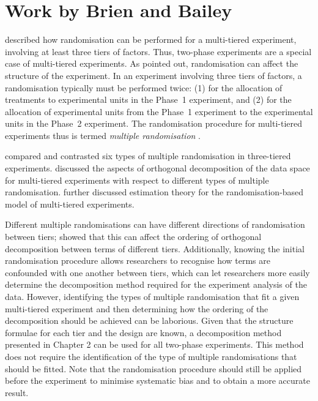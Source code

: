 \section{Work by Brien and Bailey} 
\cite{Brien2006b} described how randomisation can be performed for a multi-tiered experiment, involving at least three tiers of factors. Thus, two-phase experiments are a special case of multi-tiered experiments. As \cite{Brien1983} pointed out, randomisation can affect the structure of the experiment. In an experiment involving three tiers of factors, a randomisation typically must be performed twice: (1) for the allocation of treatments to experimental units in the Phase~1 experiment, and (2) for the allocation of experimental units from the Phase~1 experiment to the experimental units in the Phase~2 experiment. The randomisation procedure for multi-tiered experiments thus is termed \emph{multiple randomisation} \citep{Brien2006b}.  

\cite{Brien2006b} compared and contrasted six types of multiple randomisation in three-tiered experiments. \cite{Brien2009, Brien2010} discussed the aspects of orthogonal decomposition of the data space for multi-tiered experiments with respect to different types of multiple randomisation. \cite{bailey2016} further discussed estimation theory for the randomisation-based model of multi-tiered experiments. 

Different multiple randomisations can have different directions of randomisation between tiers; \cite{Brien2009, Brien2010} showed that this can affect the ordering of orthogonal decomposition between terms of different tiers. Additionally, knowing the initial randomisation procedure allows researchers to recognise how terms are confounded with one another between tiers, which can let researchers more easily determine the decomposition method required for the experiment analysis of the data. However, identifying the types of multiple randomisation that fit a given multi-tiered experiment and then determining how the ordering of the decomposition should be achieved can be laborious. Given that the structure formulae for each tier and the design are known, a decomposition method presented in Chapter 2 can be used for all two-phase experiments. This method does not require the identification of the type of multiple randomisations that should be fitted. Note that the randomisation procedure should still be applied before the experiment to minimise systematic bias and to obtain a more accurate result. 

